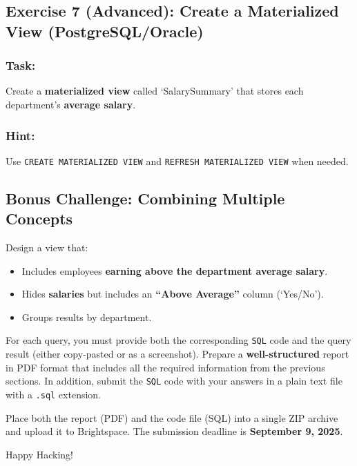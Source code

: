 \documentclass{article}
\begin{document}
\subsection*{Exercise 7 (Advanced): Create a Materialized View (PostgreSQL/Oracle)}
\subsubsection*{Task:}
Create a \textbf{materialized view} called `SalarySummary' that stores each department’s \textbf{average salary}.

\subsubsection*{Hint:}
Use \texttt{CREATE MATERIALIZED VIEW} and \texttt{REFRESH MATERIALIZED VIEW} when needed.

\subsection*{Bonus Challenge: Combining Multiple Concepts}
Design a view that:

\begin{itemize}
  \item Includes employees \textbf{earning above the department average salary}.
  \item Hides \textbf{salaries} but includes an \textbf{``Above Average''} column (`Yes/No').
  \item Groups results by department.
\end{itemize}

For each query, you must provide both the corresponding \texttt{SQL} code and the query result (either copy-pasted or as a screenshot). Prepare a \textbf{well-structured} report in PDF format that includes all the required information from the previous sections. In addition, submit the \texttt{SQL} code with your answers in a plain text file with a \texttt{.sql} extension.

Place both the report (PDF) and the code file (SQL) into a single ZIP archive and upload it to Brightspace. The submission deadline is \textbf{September 9, 2025}.

\vspace{5mm}
Happy Hacking! 
\end{document}
